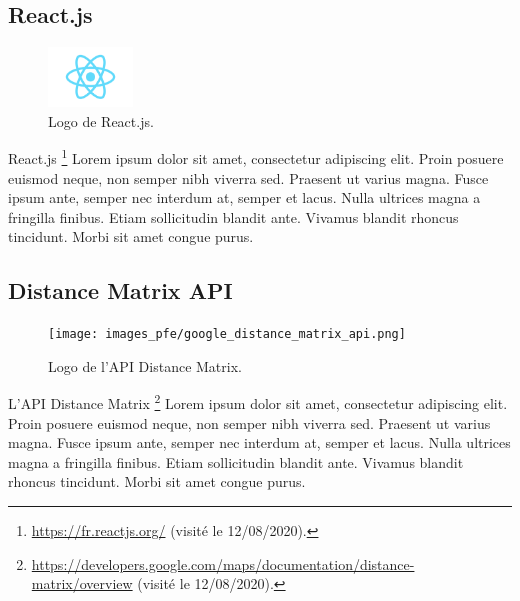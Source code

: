 \vspace{3cm}

\subsection*{React.js}

\begin{figure}
  \centering
  \includegraphics[width=0.2\textwidth]{images_pfe/react_logo.png}
  \caption{Logo de React.js.}
\end{figure}
\FloatBarrier
React.js \footnote{\url{https://fr.reactjs.org/} (visité le 12/08/2020).} Lorem ipsum dolor sit amet, consectetur adipiscing elit. Proin posuere euismod neque, non semper nibh viverra sed. Praesent ut varius magna. Fusce ipsum ante, semper nec interdum at, semper et lacus. Nulla ultrices magna a fringilla finibus. Etiam sollicitudin blandit ante. Vivamus blandit rhoncus tincidunt. Morbi sit amet congue purus. 

\vspace{1cm}

\subsection*{Distance Matrix API}
\begin{figure}
  \centering
  \texttt{[image: images\_pfe/google\_distance\_matrix\_api.png]}
  \caption{Logo de l'API Distance Matrix.}
\end{figure}
\FloatBarrier
L'API Distance Matrix \footnote{\url{https://developers.google.com/maps/documentation/distance-matrix/overview} (visité le 12/08/2020).} Lorem ipsum dolor sit amet, consectetur adipiscing elit. Proin posuere euismod neque, non semper nibh viverra sed. Praesent ut varius magna. Fusce ipsum ante, semper nec interdum at, semper et lacus. Nulla ultrices magna a fringilla finibus. Etiam sollicitudin blandit ante. Vivamus blandit rhoncus tincidunt. Morbi sit amet congue purus. 

\vspace{1cm}

